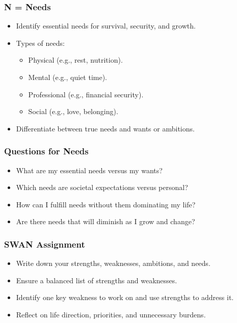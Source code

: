 \begin{frame}[fragile]\frametitle{N = Needs}
    \begin{itemize}
        \item Identify essential needs for survival, security, and growth.
        \item Types of needs:
        \begin{itemize}
            \item Physical (e.g., rest, nutrition).
            \item Mental (e.g., quiet time).
            \item Professional (e.g., financial security).
            \item Social (e.g., love, belonging).
        \end{itemize}
        \item Differentiate between true needs and wants or ambitions.
    \end{itemize}
\end{frame}

\begin{frame}[fragile]\frametitle{Questions for Needs}
    \begin{itemize}
        \item What are my essential needs versus my wants?
        \item Which needs are societal expectations versus personal?
        \item How can I fulfill needs without them dominating my life?
        \item Are there needs that will diminish as I grow and change?
    \end{itemize}
\end{frame}

\begin{frame}[fragile]\frametitle{SWAN Assignment}
    \begin{itemize}
        \item Write down your strengths, weaknesses, ambitions, and needs.
        \item Ensure a balanced list of strengths and weaknesses.
        \item Identify one key weakness to work on and use strengths to address it.
        \item Reflect on life direction, priorities, and unnecessary burdens.
    \end{itemize}
\end{frame}


